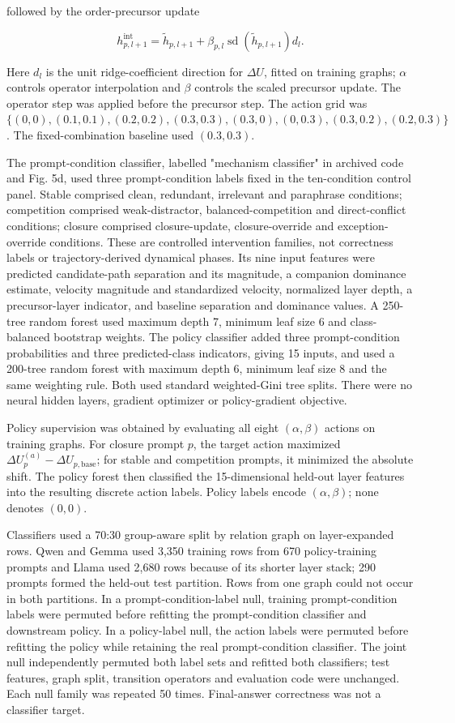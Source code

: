 \documentclass[12pt]{article}
\begin{document}
followed by the order-precursor update

\[
h_{p,l+1}^{\mathrm{int}}=\tilde h_{p,l+1}+\beta_{p,l}\operatorname{sd}(\tilde h_{p,l+1})d_l.
\]

Here \(d_l\) is the unit ridge-coefficient direction for \(\Delta U\), fitted on training graphs; \(\alpha\) controls operator interpolation and \(\beta\) controls the scaled precursor update. The operator step was applied before the precursor step. The action grid was \(\{(0,0),(0.1,0.1),(0.2,0.2),(0.3,0.3),(0.3,0),(0,0.3),(0.3,0.2),(0.2,0.3)\}\). The fixed-combination baseline used \((0.3,0.3)\).

The prompt-condition classifier, labelled "mechanism classifier" in archived code and Fig. 5d, used three prompt-condition labels fixed in the ten-condition control panel. Stable comprised clean, redundant, irrelevant and paraphrase conditions; competition comprised weak-distractor, balanced-competition and direct-conflict conditions; closure comprised closure-update, closure-override and exception-override conditions. These are controlled intervention families, not correctness labels or trajectory-derived dynamical phases. Its nine input features were predicted candidate-path separation and its magnitude, a companion dominance estimate, velocity magnitude and standardized velocity, normalized layer depth, a precursor-layer indicator, and baseline separation and dominance values. A 250-tree random forest used maximum depth 7, minimum leaf size 6 and class-balanced bootstrap weights. The policy classifier added three prompt-condition probabilities and three predicted-class indicators, giving 15 inputs, and used a 200-tree random forest with maximum depth 6, minimum leaf size 8 and the same weighting rule. Both used standard weighted-Gini tree splits. There were no neural hidden layers, gradient optimizer or policy-gradient objective.

Policy supervision was obtained by evaluating all eight \((\alpha,\beta)\) actions on training graphs. For closure prompt \(p\), the target action maximized \(\Delta U_p^{(a)}-\Delta U_{p,\mathrm{base}}\); for stable and competition prompts, it minimized the absolute shift. The policy forest then classified the 15-dimensional held-out layer features into the resulting discrete action labels. Policy labels encode \((\alpha,\beta)\); none denotes \((0,0)\).

Classifiers used a 70:30 group-aware split by relation graph on layer-expanded rows. Qwen and Gemma used 3,350 training rows from 670 policy-training prompts and Llama used 2,680 rows because of its shorter layer stack; 290 prompts formed the held-out test partition. Rows from one graph could not occur in both partitions. In a prompt-condition-label null, training prompt-condition labels were permuted before refitting the prompt-condition classifier and downstream policy. In a policy-label null, the action labels were permuted before refitting the policy while retaining the real prompt-condition classifier. The joint null independently permuted both label sets and refitted both classifiers; test features, graph split, transition operators and evaluation code were unchanged. Each null family was repeated 50 times. Final-answer correctness was not a classifier target.
\end{document}
